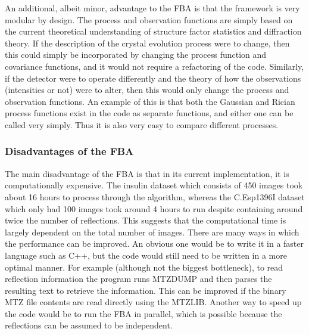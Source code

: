 An additional, albeit minor, advantage to the FBA is that the framework is very modular by design.
The process and observation functions are simply based on the current theoretical understanding of structure factor statistics and diffraction theory.
If the description of the crystal evolution process were to change, then this could simply be incorporated by changing the process function and covariance functions, and it would not require a refactoring of the code.
Similarly, if the detector were to operate differently and the theory of how the observations (intensities or not) were to alter, then this would only change the process and observation functions.
An example of this is that both the Gaussian and Rician process functions exist in the code as separate functions, and either one can be called very simply.
Thus it is also very easy to compare different processes.

\subsubsection{Disadvantages of the FBA}
\label{subs:Disadvantages of the FBA}
The main disadvantage of the FBA is that in its current implementation, it is computationally expensive.
The insulin dataset which consists of 450 images took about 16 hours to process through the algorithm, whereas the C.Esp1396I dataset which only had 100 images took around 4 hours to run despite containing around twice the number of reflections.
This suggests that the computational time is largely dependent on the total number of images.
There are many ways in which the performance can be improved.
An obvious one would be to write it in a faster language such as C++, but the code would still need to be written in a more optimal manner.
For example (although not the biggest bottleneck), to read reflection information the program runs MTZDUMP and then parses the resulting text to retrieve the information.
This can be improved if the binary MTZ file contents are read directly using the MTZLIB.
Another way to speed up the code would be to run the FBA in parallel, which is possible because the reflections can be assumed to be independent.

